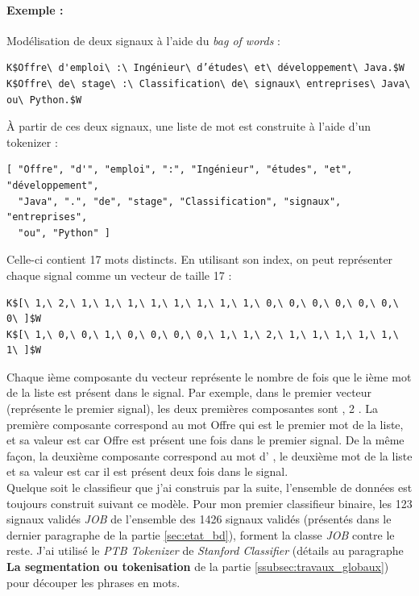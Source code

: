             \paragraph{Exemple :}
                Modélisation de deux signaux à l'aide du \textit{bag of words} :
\begin{lstlisting}
K$Offre\ d'emploi\ :\ Ingénieur\ d’études\ et\ développement\ Java.$W
K$Offre\ de\ stage\ :\ Classification\ de\ signaux\ entreprises\ Java\ ou\ Python.$W
\end{lstlisting}
                À partir de ces deux signaux, une liste de mot est construite à l'aide d'un tokenizer :
\begin{verbatim}
[ "Offre", "d'", "emploi", ":", "Ingénieur", "études", "et", "développement",
  "Java", ".", "de", "stage", "Classification", "signaux", "entreprises",
  "ou", "Python" ]
\end{verbatim}
                Celle-ci contient 17 mots distincts. En utilisant son index, on peut représenter chaque signal comme un vecteur de taille 17 :
\begin{lstlisting}
K$[\ 1,\ 2,\ 1,\ 1,\ 1,\ 1,\ 1,\ 1,\ 1,\ 1,\ 0,\ 0,\ 0,\ 0,\ 0,\ 0,\ 0\ ]$W
K$[\ 1,\ 0,\ 0,\ 1,\ 0,\ 0,\ 0,\ 0,\ 1,\ 1,\ 2,\ 1,\ 1,\ 1,\ 1,\ 1,\ 1\ ]$W
\end{lstlisting}
                Chaque ième composante du vecteur représente le nombre de fois que le ième mot de la liste est présent dans le signal. Par exemple, dans le premier vecteur (représente le premier signal), les deux premières composantes sont , 2 \fg. La première composante correspond au mot \og Offre \fg qui est le premier mot de la liste, et sa valeur est  \fg car \og Offre \fg est présent une fois dans le premier signal. De la même façon, la deuxième composante correspond au mot \og d' \fg, le deuxième mot de la liste et sa valeur est  \fg car il est présent deux fois dans le signal.\\

                Quelque soit le classifieur que j'ai construis par la suite, l'ensemble de données est toujours construit suivant ce modèle. Pour mon premier classifieur binaire, les 123 signaux validés \textit{JOB} de l'ensemble des 1426 signaux validés (présentés dans le dernier paragraphe de la partie \ref{sec:etat_bd}), forment la classe \textit{JOB} contre le reste. J'ai utilisé le \textit{PTB Tokenizer} de \textit{Stanford Classifier} (détails au paragraphe \textbf{La segmentation ou tokenisation} de la partie \ref{ssubsec:travaux_globaux}) pour découper les phrases en mots.\\

